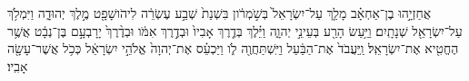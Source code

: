 \documentclass{openreader}
\begin{document}
אֲחַזְיָ֣הוּ בֶן־אַחְאָ֗ב מָלַ֤ךְ עַל־יִשְׂרָאֵל֙ בְּשֹׁ֣מְרֹ֔ון בִּשְׁנַת֙ שְׁבַ֣ע עֶשְׂרֵ֔ה לִיהֹושָׁפָ֖ט מֶ֣לֶךְ יְהוּדָ֑ה וַיִּמְלֹ֥ךְ עַל־יִשְׂרָאֵ֖ל שְׁנָתָֽיִם׃ 
וַיַּ֥עַשׂ הָרַ֖ע בְּעֵינֵ֣י יְהוָ֑ה וַיֵּ֗לֶךְ בְּדֶ֤רֶךְ אָבִיו֙ וּבְדֶ֣רֶךְ אִמֹּ֔ו וּבְדֶ֨רֶךְ֙ יָרָבְעָ֣ם בֶּן־נְבָ֔ט אֲשֶׁ֥ר הֶחֱטִ֖יא אֶת־יִשְׂרָאֵֽל׃ 
וַֽיַּעֲבֹד֙ אֶת־הַבַּ֔עַל וַיִּֽשְׁתַּחֲוֶ֖ה לֹ֑ו וַיַּכְעֵ֗ס אֶת־יְהוָה֙ אֱלֹהֵ֣י יִשְׂרָאֵ֔ל כְּכֹ֥ל אֲשֶׁר־עָשָׂ֖ה אָבִֽיו׃ 
\end{document}
